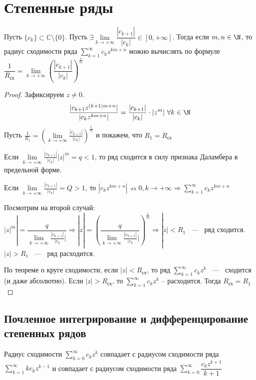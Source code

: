 \section{Степенные ряды}

\begin{lemma}
    Пусть $\{c_k\} \subset \mathbb{C} \setminus \{0\}$. Пусть $\exists \lim\limits_{k \rightarrow +\infty} \dfrac{|c_{k + 1}|}{|c_k|} \in [0, +\infty]$. Тогда если $m, n \in \N$, то радиус сходимости ряда $\sum\limits_{k = 1}^{\infty}c_kz^{km + n}$ можно вычислять по формуле $\dfrac{1}{R_{\text{сх}}} = \lim\limits_{k \rightarrow +\infty} \left(\dfrac{|c_{k + 1}|}{|c_k|} \right)^{\frac{1}{m}}$
\end{lemma}
\begin{proof}
    Зафиксируем $z \neq 0$. 
    $$
    \dfrac{|c_{k + 1} z^{(k + 1)m + n}|}{|c_kz^{km + n}|} = \dfrac{|c_{k + 1}|}{|c_k|} \cdot |z^m| \ \forall k \in \N
    $$
    Пусть $\frac{1}{R_1} = \left( \lim\limits_{k \rightarrow +\infty } \frac{|c_{k + 1}|}{|c_k|}\right) ^ {\frac{1}{m}}$ и покажем, что $R_1 = R_{\text{сх}}$

    \noindent Если $\lim\limits_{k \rightarrow +\infty } \frac{|c_{k + 1}|}{|c_k|} |z|^m = q < 1$, то ряд сходится в силу признака Даламбера в предельной форме. 

    \noindent Если $\lim\limits_{k \rightarrow +\infty } \frac{|c_{k + 1}|}{|c_k|} = Q > 1$, то $|c_k z^{km + n}| \nrightarrow 0, k \rightarrow +\infty \Rightarrow \sum\limits_{k = 1}^{\infty} c_kz^{km + n}$

    \noindent Посмотрим на второй случай: $|z|^m| = \dfrac{q}{\lim\limits_{k \rightarrow +\infty } \frac{|c_{k + 1}|}{|c_k}|} \Rightarrow |z| = \left( \dfrac{q}{\lim\limits_{k \rightarrow +\infty } \frac{|c_{k + 1}|}{|c_k}|} \right)^{\frac{1}{m}} \Rightarrow |z| < R_1$ ~---~ ряд сходится. $|z| > R_1$ ~---~ ряд расходится.

    \noindent По теореме о круге сходимости, если $|z| < R_{\text{сх}}$, то ряд $\sum\limits_{k = 1}^{\infty} c_kz^{k}$ ~---~ сходится (и даже абсолютно). Если $|z| > R_{\text{сх}}$, то $\sum\limits_{k = 1}^{\infty} c_kz^{k}$ -- расходится. Тогда $R_{\text{сх}} = R_1$ 
\end{proof}

\subsection{Почленное интегрирование и дифференцирование степенных рядов}

\begin{lemma}
    Радиус сходимости $\sum\limits_{k = 0}^{\infty} c_kz^{k}$ совпадает с радиусом сходимости ряда $\sum\limits_{k = 1}^{\infty} kc_kz^{k - 1}$ и совпадает с радиусом сходимости ряда $\sum\limits_{k = 0}^{\infty} \dfrac{c_kz^{k + 1}}{k + 1}$
\end{lemma}

